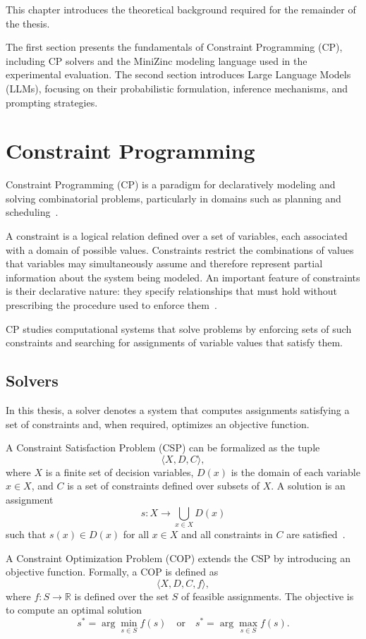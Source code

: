 \documentclass[../../main]{subfiles}
\begin{document}
This chapter introduces the theoretical background required for the remainder of the thesis.

The first section presents the fundamentals of Constraint Programming (CP), including CP solvers and the MiniZinc modeling language used in the experimental evaluation.  
The second section introduces Large Language Models (LLMs), focusing on their probabilistic formulation, inference mechanisms, and prompting strategies.

\section{Constraint Programming}

Constraint Programming (CP) is a paradigm for declaratively modeling and solving combinatorial problems, particularly in domains such as planning and scheduling~\cite{CPholygrail}.

A constraint is a logical relation defined over a set of variables, each associated with a domain of possible values. Constraints restrict the combinations of values that variables may simultaneously assume and therefore represent partial information about the system being modeled. An important feature of constraints is their declarative nature: they specify relationships that must hold without prescribing the procedure used to enforce them~\cite{CPholygrail}.

CP studies computational systems that solve problems by enforcing sets of such constraints and searching for assignments of variable values that satisfy them.

\subsection{Solvers}

In this thesis, a solver denotes a system that computes assignments satisfying a set of constraints and, when required, optimizes an objective function.

A Constraint Satisfaction Problem (CSP) can be formalized as the tuple
\[
\langle X, D, C \rangle,
\]
where \(X\) is a finite set of decision variables, \(D(x)\) is the domain of each variable \(x \in X\), and \(C\) is a set of constraints defined over subsets of \(X\). A solution is an assignment
\[
s : X \rightarrow \bigcup_{x \in X} D(x)
\]
such that \(s(x) \in D(x)\) for all \(x \in X\) and all constraints in \(C\) are satisfied~\cite{SeaPearl}.

A Constraint Optimization Problem (COP) extends the CSP by introducing an objective function. Formally, a COP is defined as
\[
\langle X, D, C, f \rangle,
\]
where \(f : S \rightarrow \mathbb{R}\) is defined over the set \(S\) of feasible assignments. The objective is to compute an optimal solution
\[
s^* = \arg\min_{s \in S} f(s)
\quad \text{or} \quad
s^* = \arg\max_{s \in S} f(s).
\]
\end{document}
